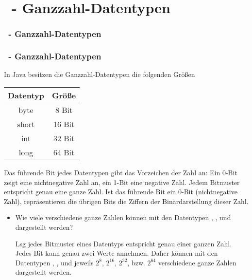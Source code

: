 \def\stitle{\theexercise\ - Ganzzahl-Datentypen}
\section{\stitle}
\begin{frame}%
  \frametitle{\stitle}
\tableofcontents[current]
\end{frame}

\begin{frame}[fragile]%
    \frametitle{\stitle}%
    
In Java besitzen die Ganzzahl-Datentypen die folgenden Größen
\begin{center}
\begin{tabular}{|c|c|}
\hline
\textbf{Datentyp} & \textbf{Größe} \\
\hline
byte       &  8 Bit         \\
short      & 16 Bit         \\
int        & 32 Bit         \\
long       & 64 Bit         \\
\hline
\end{tabular}
\end{center}
Das führende Bit jedes Datentypen gibt das Vorzeichen der Zahl an:
Ein 0-Bit zeigt eine nichtnegative Zahl an, ein 1-Bit eine negative Zahl.
Jedem Bitmuster entspricht genau eine ganze Zahl.
Ist das führende Bit ein 0-Bit (nichtnegative Zahl), repräsentieren die übrigen Bits die Ziffern der Binärdarstellung dieser Zahl.
\begin{itemize}
\item Wie viele verschiedene ganze Zahlen können mit den Datentypen , ,  und  dargestellt werden?

\item[Lsg]
jedes Bitmuster eines Datentyps entspricht genau einer ganzen Zahl.
Jedes Bit kann genau zwei Werte annehmen.
Daher können mit den Datentypen , ,  und  jeweils $2^8$, $2^{16}$, $2^{32}$, bzw. $2^{64}$ verschiedene ganze Zahlen dargestellt werden.

\end{itemize}

\end{frame}

